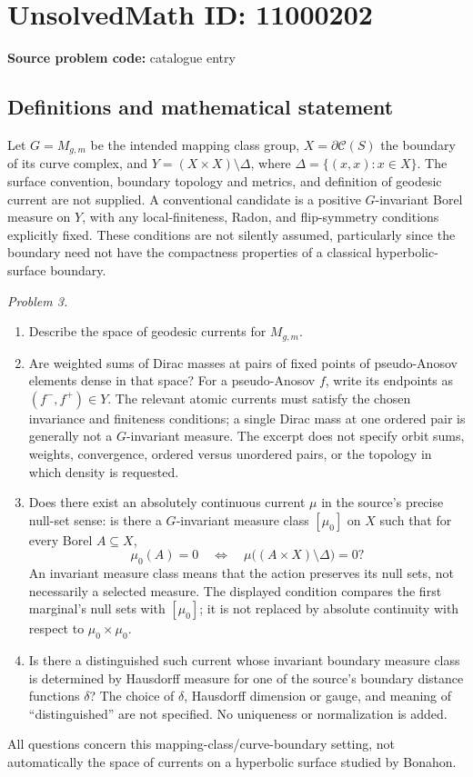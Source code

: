 \documentclass[11pt]{article}
\begin{document}
\section*{UnsolvedMath ID: 11000202}
\textbf{Source problem code:} catalogue entry
\subsection{Definitions and mathematical statement}
Let \(G=M_{g,m}\) be the intended mapping class group, \(X=\partial\mathcal C(S)\) the boundary of its curve complex, and \(Y=(X\times X)\setminus\Delta\), where \(\Delta=\{(x,x):x\in X\}\). The surface convention, boundary topology and metrics, and definition of geodesic current are not supplied. A conventional candidate is a positive \(G\)-invariant Borel measure on \(Y\), with any local-finiteness, Radon, and flip-symmetry conditions explicitly fixed. These conditions are not silently assumed, particularly since the boundary need not have the compactness properties of a classical hyperbolic-surface boundary.

\emph{Problem 3.}
\begin{enumerate}
\item Describe the space of geodesic currents for \(M_{g,m}\).
\item Are weighted sums of Dirac masses at pairs of fixed points of pseudo-Anosov elements dense in that space? For a pseudo-Anosov \(f\), write its endpoints as \((f^-,f^+)\in Y\). The relevant atomic currents must satisfy the chosen invariance and finiteness conditions; a single Dirac mass at one ordered pair is generally not a \(G\)-invariant measure. The excerpt does not specify orbit sums, weights, convergence, ordered versus unordered pairs, or the topology in which density is requested.
\item Does there exist an absolutely continuous current \(\mu\) in the source's precise null-set sense: is there a \(G\)-invariant measure class \([\mu_0]\) on \(X\) such that for every Borel \(A\subseteq X\),
\[
 \mu_0(A)=0\quad\Longleftrightarrow\quad
 \mu\bigl((A\times X)\setminus\Delta\bigr)=0?
\]
An invariant measure class means that the action preserves its null sets, not necessarily a selected measure. The displayed condition compares the first marginal's null sets with \([\mu_0]\); it is not replaced by absolute continuity with respect to \(\mu_0\times\mu_0\).
\item Is there a distinguished such current whose invariant boundary measure class is determined by Hausdorff measure for one of the source's boundary distance functions \(\delta\)? The choice of \(\delta\), Hausdorff dimension or gauge, and meaning of ``distinguished'' are not specified. No uniqueness or normalization is added.
\end{enumerate}
All questions concern this mapping-class/curve-boundary setting, not automatically the space of currents on a hyperbolic surface studied by Bonahon.
\end{document}
